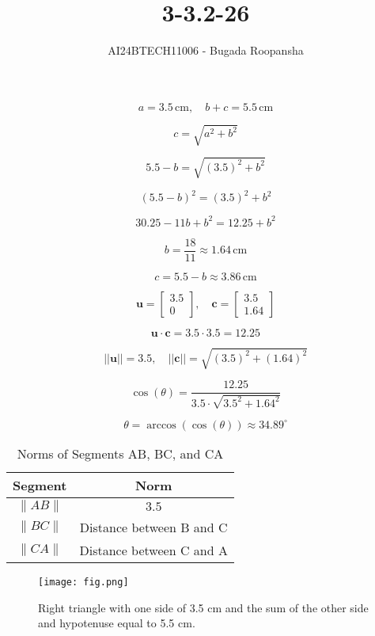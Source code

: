 \documentclass[journal]{IEEEtran}
\begin{document}

\vspace{3cm}

\title{3-3.2-26}
\author{AI24BTECH11006 - Bugada Roopansha}
{\let\newpage\relax\maketitle}  %

\renewcommand{\thefigure}{\theenumi}
\renewcommand{\thetable}{\theenumi}
\setlength{\intextsep}{10pt} %

\[
a = 3.5 \, \text{cm}, \quad b + c = 5.5 \, \text{cm}
\]

\[
c = \sqrt{a^2 + b^2}
\]

\[
5.5 - b = \sqrt{(3.5)^2 + b^2}
\]

\[
(5.5 - b)^2 = (3.5)^2 + b^2
\]

\[
30.25 - 11b + b^2 = 12.25 + b^2
\]

\[
b = \frac{18}{11} \approx 1.64 \, \text{cm}
\]

\[
c = 5.5 - b \approx 3.86 \, \text{cm}
\]

\[
\mathbf{u} = \begin{bmatrix} 3.5 \\ 0 \end{bmatrix}, \quad \mathbf{c} = \begin{bmatrix} 3.5 \\ 1.64 \end{bmatrix}
\]

\[
\mathbf{u} \cdot \mathbf{c} = 3.5 \cdot 3.5 = 12.25
\]

\[
||\mathbf{u}|| = 3.5, \quad ||\mathbf{c}|| = \sqrt{(3.5)^2 + (1.64)^2}
\]

\[
\cos(\theta) = \frac{12.25}{3.5 \cdot \sqrt{3.5^2 + 1.64^2}}
\]

\[
\theta = \arccos\left(\cos(\theta)\right) \approx 34.89^\circ
\]

\begin{table}[h!]
\centering
\begin{tabular}{|c|c|}
\hline
\textbf{Segment} & \textbf{Norm} \\ \hline
\( \| AB \| \) & $3.5$ \\ \hline
\( \| BC \| \) & Distance between B and C \\ \hline
\( \| CA \| \) & Distance between C and A \\ \hline
\end{tabular}
\caption{Norms of Segments AB, BC, and CA}
\label{tab:segment_norms}
\end{table}
\begin{figure}[h!]
\centering
\texttt{[image: fig.png]} %
\caption{Right triangle with one side of 3.5 cm and the sum of the other side and hypotenuse equal to 5.5 cm.}
\end{figure}
\end{document}
